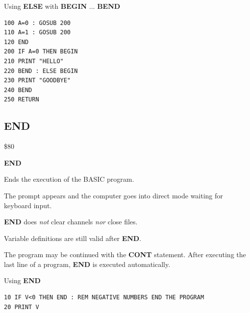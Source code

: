 \begin{description}[leftmargin=2cm,style=nextline]
                  Using {\bf ELSE} with {\bf BEGIN} ... {\bf BEND}

\begin{tcolorbox}[colback=black,coltext=white]
\verbatimfont{\codefont}
\begin{verbatim}
100 A=0 : GOSUB 200
110 A=1 : GOSUB 200
120 END
200 IF A=0 THEN BEGIN
210 PRINT "HELLO"
220 BEND : ELSE BEGIN
230 PRINT "GOODBYE"
240 BEND
250 RETURN
\end{verbatim}
\end{tcolorbox}
\end{description}


\newpage
\subsection{END}
\begin{description}[leftmargin=2cm,style=nextline]
\item [Token:]    \$80

\item [Format:]   {\bf END}

\item [Usage:]    Ends the execution of the BASIC program.

                  The  prompt appears and the computer goes into direct mode waiting for keyboard input.

\item [Remarks:]  {\bf END} does \emph{not} clear channels \emph{nor} close files.

                  Variable definitions are still valid after {\bf END}.
                  
                  The program may be continued with the {\bf CONT} statement. After executing the last line of a program, {\bf END} is executed automatically.

\item [Example:]  Using {\bf END}

\begin{tcolorbox}[colback=black,coltext=white]
\verbatimfont{\codefont}
\begin{verbatim}
10 IF V<0 THEN END : REM NEGATIVE NUMBERS END THE PROGRAM
20 PRINT V
\end{verbatim}
\end{tcolorbox}
\end{description}


